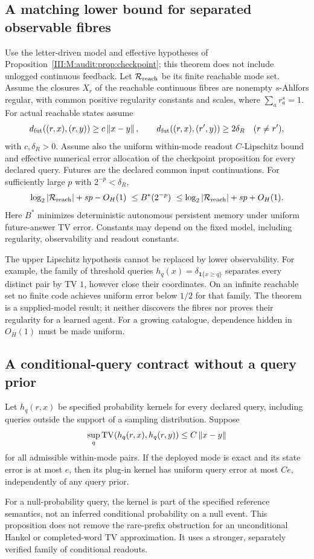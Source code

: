 \subsection{A matching lower bound for separated observable fibres}
\begin{theorem}
\label{III:M:thm:joint-mode-optimum}
Use the letter-driven model and effective hypotheses of
Proposition~\ref{III:M:audit:prop:checkpoint}; this theorem does not include
unlogged continuous feedback. Let $\mathcal R_{\rm reach}$ be its finite
reachable mode set. Assume the closures $X_r$ of the reachable continuous
fibres are nonempty $s$-Ahlfors regular, with common positive regularity
constants and scales, where $\sum_a r_a^s=1$.
For actual reachable states assume
\[
 d_{\rm fut}((r,x),(r,y))\ge c\left\lVert x-y\right\rVert,\qquad
 d_{\rm fut}((r,x),(r',y))\ge2\delta_R\quad(r\ne r'),
\]
with $c,\delta_R>0$. Assume also the uniform within-mode readout
$C$-Lipschitz bound and effective numerical error allocation of the
checkpoint proposition for every declared query. Futures are the
declared common input continuations. For sufficiently large $p$ with
$2^{-p}<\delta_R$,
\[
 \log_2|\mathcal R_{\rm reach}|+sp-O_H(1)
 \ \le B^*(2^{-p})\ \le
 \log_2|\mathcal R_{\rm reach}|+sp+O_H(1).
\]
Here $B^*$ minimizes deterministic autonomous persistent memory under
uniform future-answer TV error. Constants may depend on the fixed model,
including regularity, observability and readout constants.
\end{theorem}

The upper Lipschitz hypothesis cannot be replaced by lower observability.
For example, the family of threshold queries $h_q(x)=\delta_{\mathbf1\{x\ge q\}}$
separates every distinct pair by TV $1$, however close their coordinates.
On an infinite reachable set no finite code achieves uniform error below
$1/2$ for that family. The theorem is a supplied-model result; it neither
discovers the fibres nor proves their regularity for a learned agent.
For a growing catalogue, dependence hidden in $O_H(1)$ must be made uniform.

\subsection{A conditional-query contract without a query prior}
\begin{proposition}\label{III:M:prop:query-kernels}
Let $h_q(r,x)$ be specified probability kernels for every declared query,
including queries outside the support of a sampling distribution. Suppose
\[
 \sup_q\operatorname{TV}(h_q(r,x),h_q(r,y))\le C\left\lVert x-y\right\rVert
\]
for all admissible within-mode pairs. If the deployed mode is exact and
its state error is at most $e$, then its plug-in kernel has uniform query
error at most $Ce$, independently of any query prior.
\end{proposition}

For a null-probability query, the kernel is part of the specified reference
semantics, not an inferred conditional probability on a null event.
This proposition does not remove the rare-prefix obstruction for an
unconditional Hankel or completed-word TV approximation. It uses a
stronger, separately verified family of conditional readouts.

